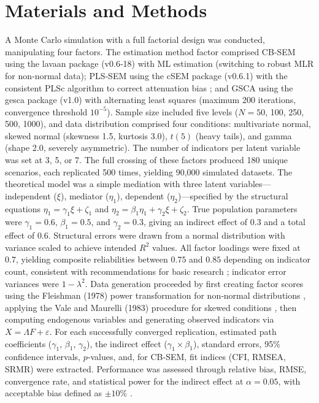 \documentclass[twoside]{article}
\begin{document}
\section{Materials and Methods}
A Monte Carlo simulation with a full factorial design was conducted, manipulating four factors. The estimation method factor comprised CB‑SEM using the lavaan package (v0.6‑18) \cite{ROSSEEL:2012} with ML estimation (switching to robust MLR for non‑normal data); PLS‑SEM using the cSEM package (v0.6.1) \cite{RADEMAKER:2025} with the consistent PLSc algorithm to correct attenuation bias \cite{DIJKSTRA:2015}; and GSCA using the gesca package (v1.0) \cite{KIM:2017} with alternating least squares (maximum 200 iterations, convergence threshold $10^{-5}$). Sample size included five levels ($N = 50$, 100, 250, 500, 1000), and data distribution comprised four conditions: multivariate normal, skewed normal (skewness 1.5, kurtosis 3.0), $t(5)$ (heavy tails), and gamma (shape 2.0, severely asymmetric). The number of indicators per latent variable was set at 3, 5, or 7. The full crossing of these factors produced 180 unique scenarios, each replicated 500 times, yielding 90,000 simulated datasets.
The theoretical model was a simple mediation with three latent variables---independent ($\xi$), mediator ($\eta_1$), dependent ($\eta_2$)---specified by the structural equations $\eta_1 = \gamma_1 \xi + \zeta_1$ and $\eta_2 = \beta_1 \eta_1 + \gamma_2 \xi + \zeta_2$. True population parameters were $\gamma_1 = 0.6$, $\beta_1 = 0.5$, and $\gamma_2 = 0.3$, giving an indirect effect of $0.3$ and a total effect of $0.6$. Structural errors were drawn from a normal distribution with variance scaled to achieve intended $R^2$ values. All factor loadings were fixed at $0.7$, yielding composite reliabilities between $0.75$ and $0.85$ depending on indicator count, consistent with recommendations for basic research \cite{Nunally and Bernstein:1994}; indicator error variances were $1 - \lambda^2$. Data generation proceeded by first creating factor scores using the Fleishman (1978) power transformation for non‑normal distributions \cite{FLEISHMAN:1978}, applying the Vale and Maurelli (1983) procedure for skewed conditions \cite{VALE:1983}, then computing endogenous variables and generating observed indicators via $X = \Lambda F + \varepsilon$. For each successfully converged replication, estimated path coefficients ($\gamma_1$, $\beta_1$, $\gamma_2$), the indirect effect ($\gamma_1 \times \beta_1$), standard errors, 95\% confidence intervals, $p$‑values, and, for CB‑SEM, fit indices (CFI, RMSEA, SRMR) were extracted. Performance was assessed through relative bias, RMSE, convergence rate, and statistical power for the indirect effect at $\alpha = 0.05$, with acceptable bias defined as $\pm 10\%$ \cite{HOOGLAND:1989}.
\end{document}
